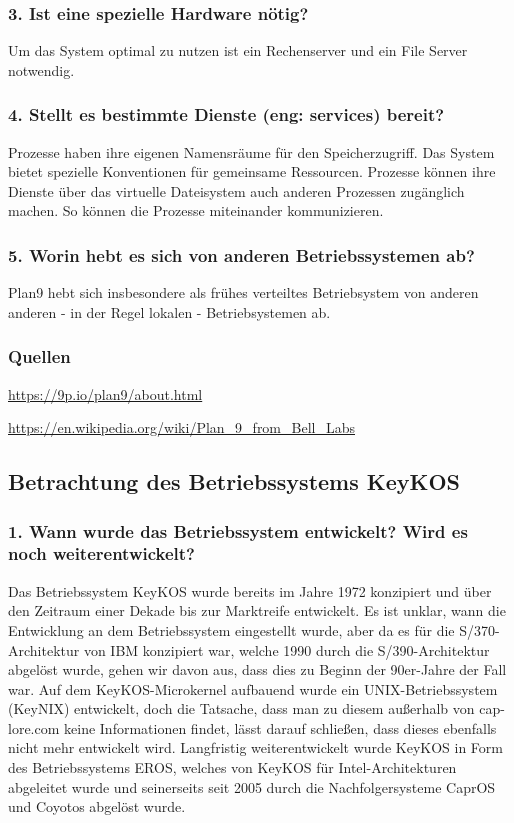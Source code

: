 \documentclass[numbers=noendperiod]{scrartcl}
\begin{document}
\subsubsection*{3. Ist eine spezielle Hardware nötig?}
Um das System optimal zu nutzen ist ein Rechenserver und ein File Server notwendig.

\subsubsection*{4. Stellt es bestimmte Dienste (eng: services) bereit?}
Prozesse haben ihre eigenen Namensräume für den Speicherzugriff. Das System bietet spezielle Konventionen für gemeinsame Ressourcen.
Prozesse können ihre Dienste über das virtuelle Dateisystem auch anderen Prozessen zugänglich machen. So können die Prozesse miteinander kommunizieren.

\subsubsection*{5. Worin hebt es sich von anderen Betriebssystemen ab?}
Plan9 hebt sich insbesondere als frühes verteiltes Betriebsystem von anderen anderen - in der Regel lokalen - Betriebsystemen ab.

\subsubsection*{Quellen}
\url{https://9p.io/plan9/about.html}

\url{https://en.wikipedia.org/wiki/Plan_9_from_Bell_Labs}

\subsection*{Betrachtung des Betriebssystems KeyKOS}

\subsubsection*{1. Wann wurde das Betriebssystem entwickelt? Wird es noch weiterentwickelt?}

Das Betriebssystem KeyKOS wurde bereits im Jahre 1972 konzipiert und über den Zeitraum einer Dekade bis zur Marktreife entwickelt. Es ist unklar, wann die Entwicklung an dem Betriebssystem eingestellt wurde, aber da es für die S/370-Architektur von IBM konzipiert war, welche 1990 durch die S/390-Architektur abgelöst wurde, gehen wir davon aus, dass dies zu Beginn der 90er-Jahre der Fall war. Auf dem KeyKOS-Microkernel aufbauend wurde ein UNIX-Betriebssystem (KeyNIX) entwickelt, doch die Tatsache, dass man zu diesem außerhalb von cap-lore.com keine Informationen findet, lässt darauf schließen, dass dieses ebenfalls nicht mehr entwickelt wird.
Langfristig weiterentwickelt wurde KeyKOS in Form des Betriebssystems EROS, welches von KeyKOS für Intel-Architekturen abgeleitet wurde und seinerseits seit 2005 durch die Nachfolgersysteme CaprOS und Coyotos abgelöst wurde.
\end{document}
